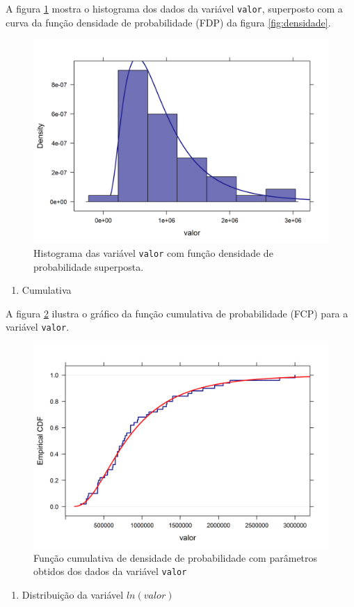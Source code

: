 \documentclass[a4paper]{article}
\providecommand{\tightlist}{%
  \setlength{\itemsep}{0pt}\setlength{\parskip}{0pt}}
\let\code=\texttt
\begin{document}
A figura \ref{fig:hist_densidade} mostra o histograma dos dados da
variável \texttt{valor}, superposto com a curva da função densidade de
probabilidade (FDP) da figura \ref{fig:densidade}.

\begin{figure}[H]

{\centering \includegraphics[width=0.5\linewidth]{images/hist_densidade-1} 

}

\caption{Histograma das variável \code{valor} com função densidade de probabilidade superposta.}\label{fig:hist_densidade}
\end{figure}

\begin{enumerate}
\def\labelenumi{\alph{enumi}.}
\setcounter{enumi}{2}
\tightlist
\item
  Cumulativa
\end{enumerate}

A figura \ref{fig:cdf} ilustra o gráfico da função cumulativa de
probabilidade (FCP) para a variável \texttt{valor}.

\begin{figure}[H]

{\centering \includegraphics[width=0.5\linewidth]{images/cdf-1} 

}

\caption{Função cumulativa de densidade de probabilidade com parâmetros obtidos dos dados da variável \code{valor}}\label{fig:cdf}
\end{figure}

\begin{enumerate}
\def\labelenumi{\alph{enumi}.}
\setcounter{enumi}{3}
\tightlist
\item
  Distribuição da variável \(ln(valor)\)
\end{enumerate}
\end{document}
